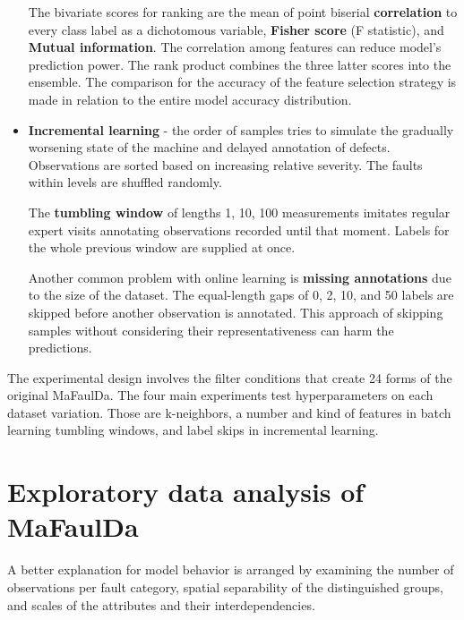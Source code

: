 \begin{itemize}
The bivariate scores for ranking are the mean of point biserial \textbf{correlation} to every class label as a dichotomous variable, \textbf{Fisher score} (F statistic), and \textbf{Mutual information}. The correlation among features can reduce model's prediction power. The rank product combines the three latter scores into the ensemble. The comparison for the accuracy of the feature selection strategy is made in relation to the entire model accuracy distribution. 

\item \textbf{Incremental learning} - the order of samples tries to simulate the gradually worsening state of the machine and delayed annotation of defects. Observations are sorted based on increasing relative severity. The faults within levels are shuffled randomly. 

The \textbf{tumbling window} of lengths 1, 10, 100 measurements imitates regular expert visits annotating observations recorded until that moment. Labels for the whole previous window are supplied at once.

Another common problem with online learning is \textbf{missing annotations} due to the size of the dataset. The equal-length gaps of 0, 2, 10, and 50 labels are skipped before another observation is annotated. This approach of skipping samples without considering their representativeness can harm the predictions. 
\end{itemize}

The experimental design involves the filter conditions that create 24 forms of the original MaFaulDa. The four main experiments test hyperparameters on each dataset variation. Those are k-neighbors, a number and kind of features in batch learning tumbling windows, and label skips in incremental learning.

\section{Exploratory data analysis of MaFaulDa}
A better explanation for model behavior is arranged by examining the number of observations per fault category, spatial separability of the distinguished groups, and scales of the attributes and their interdependencies.

